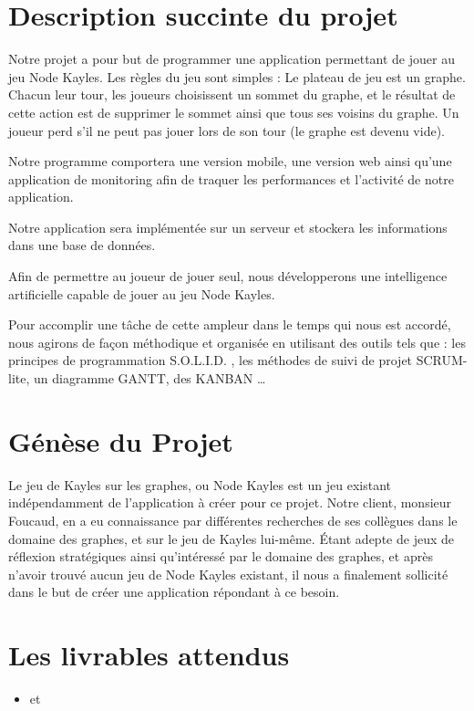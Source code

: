 \documentclass[a4paper, 12pt,table]{report}
\begin{document}
\section{Description succinte du projet}
Notre projet a pour but de programmer une application permettant de jouer au jeu Node Kayles. Les règles du jeu sont simples :
Le plateau de jeu est un graphe. Chacun leur tour, les joueurs choisissent un sommet du graphe, et le résultat de cette action est de supprimer le sommet ainsi que tous ses voisins du graphe. Un joueur perd s'il ne peut pas jouer lors de son tour (le graphe est devenu vide).

Notre programme comportera une version mobile, une version web ainsi qu'une application de monitoring afin de traquer les performances et l'activité de notre application.

Notre application sera implémentée sur un serveur et stockera les informations dans une base de données.

Afin de permettre au joueur de jouer seul, nous développerons une intelligence artificielle capable de jouer au jeu Node Kayles.

Pour accomplir une tâche de cette ampleur dans le temps qui nous est accordé, nous agirons de façon méthodique et organisée en utilisant des outils tels que : les principes de programmation S.O.L.I.D. , les méthodes de suivi de projet SCRUM-lite, un diagramme GANTT, des KANBAN …

\section{Génèse du Projet}

Le jeu de Kayles sur les graphes, ou Node Kayles est un jeu existant indépendamment de l’application à créer pour ce projet.
Notre client, monsieur Foucaud, en a eu connaissance par différentes recherches de ses collègues dans le domaine des graphes, et sur le jeu de Kayles lui-même.
Étant adepte de jeux de réflexion stratégiques ainsi qu’intéressé par le domaine des graphes, et après n’avoir trouvé aucun jeu de Node Kayles existant, il nous a finalement sollicité dans le but de créer une application répondant à ce besoin.

\section{Les livrables attendus}
\begin{itemize}
	\item{}
	et
\end{itemize}
\end{document}
